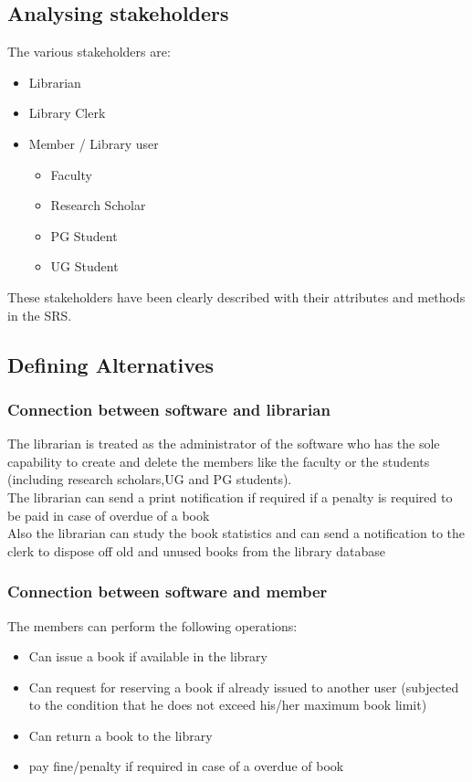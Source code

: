 \documentclass[a4paper]{article}
\begin{document}
\subsection{Analysing stakeholders}
The various stakeholders are:
\begin{itemize}
\item Librarian
\item Library Clerk
\item Member / Library user
	\begin{itemize}
	\item Faculty
	\item Research Scholar
	\item PG Student
	\item UG Student
	\end{itemize}
\end{itemize}
These stakeholders have been clearly described with their attributes and methods in the SRS.
\subsection{Defining Alternatives}
\subsubsection{Connection between software and librarian}
The librarian is treated as the administrator of the software who has the sole capability to create and delete the members like the faculty or the students (including research scholars,UG and PG students).
\\The librarian can  send a print notification if required if a penalty is required to be paid in case of overdue of a book
\\Also the librarian can study the book statistics and can send a notification to the clerk to dispose off old and unused books from the library database
\subsubsection{Connection between software and member}
The members can perform the following operations:
\begin{itemize}
\item Can issue a book if available in the library
\item Can request for reserving a book if already issued to another user (subjected to the condition that he does not exceed his/her maximum book limit)
\item Can return a book to the library
\item pay fine/penalty if required in case of a overdue of book
\end{itemize}
\end{document}
